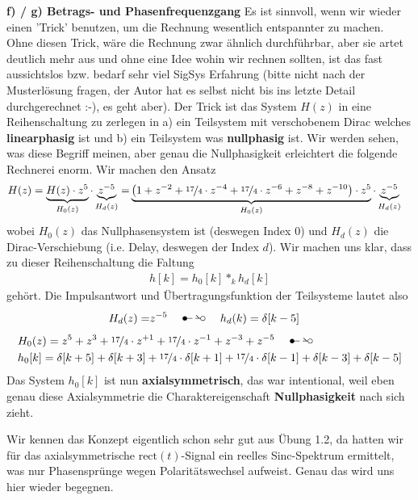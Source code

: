 \textbf{f) / g) Betrags- und Phasenfrequenzgang}
Es ist sinnvoll, wenn wir wieder einen 'Trick' benutzen, um die Rechnung wesentlich
entspannter zu machen. Ohne diesen Trick, wäre die Rechnung zwar ähnlich durchführbar,
aber sie artet deutlich mehr aus und ohne eine Idee wohin wir rechnen sollten,
ist das fast aussichtslos bzw. bedarf sehr viel SigSys Erfahrung (bitte nicht nach
der Musterlösung fragen, der Autor hat es selbst nicht bis ins letzte Detail
durchgerechnet :-), es geht aber).
%
Der Trick ist das System $H(z)$ in eine Reihenschaltung zu zerlegen in a)
ein Teilsystem mit verschobenem Dirac welches \textbf{linearphasig} ist
und b) ein Teilsystem was \textbf{nullphasig} ist. Wir werden sehen,
was diese Begriff meinen, aber genau die Nullphasigkeit erleichtert die
folgende Rechnerei enorm.
%
Wir machen den Ansatz
\begin{align}
H(z) = \underbrace{H(z) \cdot z^5}_{H_0(z)} \cdot \underbrace{z^{-5}}_{H_d(z)}= &
\underbrace{\left(1 + z^{-2} + \nicefrac{17}{4}\cdot z^{-4} + \nicefrac{17}{4}\cdot z^{-6} + z^{-8} + z^{-10}\right)
\cdot z^5}_{H_0(z)} \cdot \underbrace{z^{-5}}_{H_d(z)}
\end{align}
wobei $H_0(z)$ das Nullphasensystem ist (deswegen Index $0$) und $H_d(z)$ die
Dirac-Verschiebung (i.e. Delay, deswegen der Index $d$).
Wir machen uns klar, dass zu dieser Reihenschaltung die Faltung
\begin{align}
h[k] = h_0[k] \ast_k h_d[k]
\end{align}
gehört.
%
Die Impulsantwort und Übertragungsfunktion der Teilsysteme lautet also
\begin{align}
H_d(z) =& z^{-5} \quad\Ztransf\quad h_d(k) = \delta[k-5]
\end{align}
\begin{align}
&H_0(z) = z^5 + z^3 + \nicefrac{17}{4}\cdot z^{+1} + \nicefrac{17}{4}\cdot z^{-1} + z^{-3} + z^{-5}
\quad\Ztransf\quad\nonumber\\
&h_0[k] = \delta[k+5] + \delta[k+3] + \nicefrac{17}{4}\cdot\delta[k+1] + \nicefrac{17}{4}\cdot\delta[k-1] + \delta[k-3] + \delta[k-5]
\end{align}
%
Das System $h_0[k]$ ist nun \textbf{axialsymmetrisch}, das war intentional, weil
eben genau diese Axialsymmetrie die Charaktereigenschaft \textbf{Nullphasigkeit}
nach sich zieht.
%
\begin{center}
\end{center}
%
Wir kennen das Konzept eigentlich schon sehr gut aus Übung 1.2, da hatten
wir für das axialsymmetrische $\mathrm{rect}(t)$-Signal ein reelles
Sinc-Spektrum ermittelt, was nur Phasensprünge wegen Polaritätswechsel aufweist.
Genau das wird uns hier wieder begegnen.

